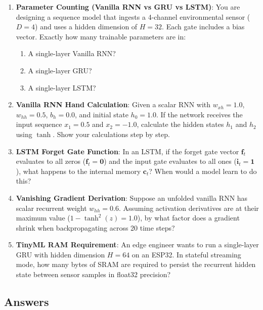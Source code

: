 \begin{checkyourself}
\begin{enumerate}
    \item \textbf{Parameter Counting (Vanilla RNN vs GRU vs LSTM)}: You are designing a sequence model that ingests a 4-channel environmental sensor ($D=4$) and uses a hidden dimension of $H=32$. Each gate includes a bias vector. Exactly how many trainable parameters are in:
    \begin{enumerate}[label=(\alph*)]
        \item A single-layer Vanilla RNN?
        \item A single-layer GRU?
        \item A single-layer LSTM?
    \end{enumerate}
    \item \textbf{Vanilla RNN Hand Calculation}: Given a scalar RNN with $w_{xh} = 1.0$, $w_{hh} = 0.5$, $b_h = 0.0$, and initial state $h_0 = 1.0$. If the network receives the input sequence $x_1 = 0.5$ and $x_2 = -1.0$, calculate the hidden states $h_1$ and $h_2$ using $\tanh$. Show your calculations step by step.
    \item \textbf{LSTM Forget Gate Function}: In an LSTM, if the forget gate vector $\mathbf{f}_t$ evaluates to all zeros ($\mathbf{f}_t = \mathbf{0}$) and the input gate evaluates to all ones ($\mathbf{i}_t = \mathbf{1}$), what happens to the internal memory $\mathbf{c}_t$? When would a model learn to do this?
    \item \textbf{Vanishing Gradient Derivation}: Suppose an unfolded vanilla RNN has scalar recurrent weight $w_{hh} = 0.6$. Assuming activation derivatives are at their maximum value ($1 - \tanh^2(z) = 1.0$), by what factor does a gradient shrink when backpropagating across 20 time steps?
    \item \textbf{TinyML RAM Requirement}: An edge engineer wants to run a single-layer GRU with hidden dimension $H=64$ on an ESP32. In stateful streaming mode, how many bytes of SRAM are required to persist the recurrent hidden state between sensor samples in float32 precision?
\end{enumerate}
\end{checkyourself}

\subsection*{Answers}\label{subsec:answers}

